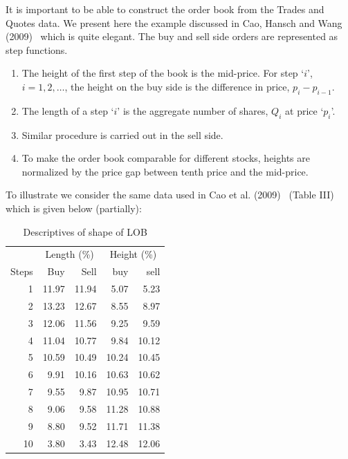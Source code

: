 It is important to be able to construct the order book from the Trades and Quotes data. We present here the example discussed in Cao, Hansch and Wang (2009)~\cite{caohanschwang} which is quite elegant. The buy and sell side orders are represented as step functions. 
\begin{enumerate}[--]
\item The height of the first step of the book is the mid-price. For step `$i$', $i=1,2,\ldots$, the height on the buy side is the difference in price, $p_i-p_{i-1}$. 
\item The length of a step `$i$' is the aggregate number of shares, $Q_i$ at price `$p_i$'.
\item Similar procedure is carried out in the sell side.
\item To make the order book comparable for different stocks, heights are normalized by the price gap between tenth price and the mid-price. 
\end{enumerate}

To illustrate we consider the same data used in Cao et al. (2009)~\cite{caohanschwang} (Table III) which is given below (partially):
	\begin{table}[!ht]
	\centering
	\caption{Descriptives of shape of LOB \label{tab:descLOB}}
	\begin{tabular}{rrrrr}
	& \multicolumn{2}{c}{Length (\%)} & \multicolumn{2}{c}{Height (\%)} \\
	Steps & Buy & Sell & buy & sell \\
	1 & 11.97 & 11.94 & 5.07 & 5.23 \\
	2 & 13.23 & 12.67 & 8.55 & 8.97 \\
	3 & 12.06 & 11.56 & 9.25 & 9.59 \\
	4 & 11.04 & 10.77 & 9.84 & 10.12 \\
	5 & 10.59 & 10.49 & 10.24 & 10.45 \\
	6 & 9.91 & 10.16 & 10.63 & 10.62 \\
	7 & 9.55 & 9.87 & 10.95 & 10.71 \\
	8 & 9.06 & 9.58 & 11.28 & 10.88 \\
	9 & 8.80 & 9.52 & 11.71 & 11.38 \\
	10 & 3.80 & 3.43 & 12.48 & 12.06
	\end{tabular}
	\end{table}

